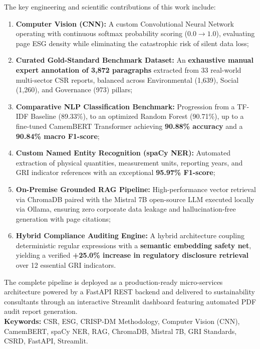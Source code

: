 \documentclass[12pt,a4paper]{report}
\begin{document}
The key engineering and scientific contributions of this work include:
\begin{enumerate}
    \item \textbf{Computer Vision (CNN):} A custom Convolutional Neural Network operating with continuous softmax probability scoring ($0.0 \rightarrow 1.0$), evaluating page ESG density while eliminating the catastrophic risk of silent data loss;
    \item \textbf{Curated Gold-Standard Benchmark Dataset:} An \textbf{exhaustive manual expert annotation of 3,872 paragraphs} extracted from 33 real-world multi-sector CSR reports, balanced across Environmental (1,639), Social (1,260), and Governance (973) pillars;
    \item \textbf{Comparative NLP Classification Benchmark:} Progression from a TF-IDF Baseline (89.33\%), to an optimized Random Forest (90.71\%), up to a fine-tuned CamemBERT Transformer achieving \textbf{90.88\% accuracy} and a \textbf{90.84\% macro F1-score};
    \item \textbf{Custom Named Entity Recognition (spaCy NER):} Automated extraction of physical quantities, measurement units, reporting years, and GRI indicator references with an exceptional \textbf{95.97\% F1-score};
    \item \textbf{On-Premise Grounded RAG Pipeline:} High-performance vector retrieval via ChromaDB paired with the Mistral 7B open-source LLM executed locally via Ollama, ensuring zero corporate data leakage and hallucination-free generation with page citations;
    \item \textbf{Hybrid Compliance Auditing Engine:} A hybrid architecture coupling deterministic regular expressions with a \textbf{semantic embedding safety net}, yielding a verified \textbf{+25.0\% increase in regulatory disclosure retrieval} over 12 essential GRI indicators.
\end{enumerate}

The complete pipeline is deployed as a production-ready micro-services architecture powered by a FastAPI REST backend and delivered to sustainability consultants through an interactive Streamlit dashboard featuring automated PDF audit report generation.\\

\textbf{Keywords:} CSR, ESG, CRISP-DM Methodology, Computer Vision (CNN), CamemBERT, spaCy NER, RAG, ChromaDB, Mistral 7B, GRI Standards, CSRD, FastAPI, Streamlit.

\newpage
\end{document}
